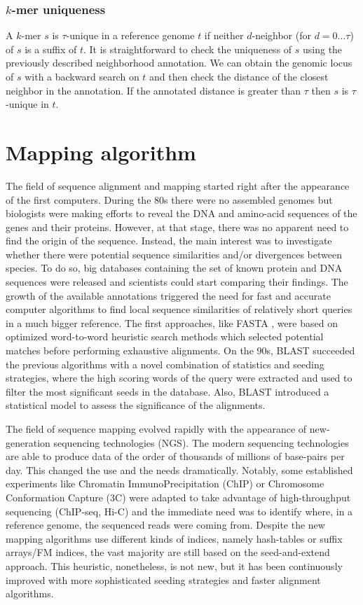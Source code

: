 \subsection{$k$-mer uniqueness}
A $k$-mer $s$ is $\tau$-unique in a reference genome $t$ if neither
$d$-neighbor (for $d = 0\ldots\tau$) of $s$ is a suffix of $t$. It is
straightforward to check the uniqueness of $s$ using the previously
described neighborhood annotation. We can obtain the genomic locus
of $s$ with a backward search on $t$ and then check the distance of
the closest neighbor in the annotation. If the annotated distance is
greater than $\tau$ then $s$ is $\tau$-unique in $t$.

\chapter{Mapping algorithm}
The field of sequence alignment and mapping started right after the
appearance of the first computers. During the 80s there were no
assembled genomes but biologists were making efforts to reveal the DNA
and amino-acid sequences of the genes and their proteins. However, at
that stage, there was no apparent need to find the origin of the
sequence. Instead, the main interest was to investigate whether there
were potential sequence similarities and/or divergences between
species. To do so, big databases containing the set of known protein
and DNA sequences were released and scientists could start comparing
their findings. The growth of the available annotations triggered the
need for fast and accurate computer algorithms to find local sequence
similarities of relatively short queries in a much bigger
reference. The first approaches, like FASTA \cite{fasta}, were based
on optimized word-to-word heuristic search methods which selected
potential matches before performing exhaustive alignments. On the 90s,
BLAST \cite{blast} succeeded the previous algorithms with a novel
combination of statistics and seeding strategies, where the high
scoring words of the query were extracted and used to filter the most
significant seeds in the  database. Also, BLAST introduced a
statistical model to assess the significance of the alignments.

The field of sequence mapping evolved rapidly with the appearance of
new-generation sequencing technologies (NGS). The modern sequencing 
technologies are able to produce data of the order of thousands of
millions of base-pairs per day. This changed the use and the needs
dramatically. Notably, some established experiments like Chromatin
ImmunoPrecipitation (ChIP) or Chromosome Conformation Capture (3C)
were adapted to take advantage of high-throughput sequencing
(ChIP-seq, Hi-C) and the immediate need was to identify where, in a
reference genome, the sequenced reads were coming from. Despite the
new mapping algorithms use different kinds of indices, namely
hash-tables or suffix arrays/FM indices, the vast majority are still
based on the seed-and-extend approach. This heuristic, nonetheless, is
not new, but it has been continuously improved with more sophisticated
seeding strategies and faster alignment algorithms.  

